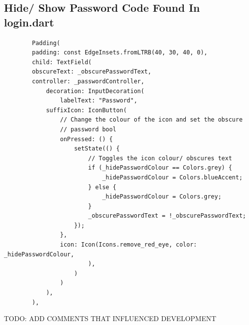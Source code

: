 \documentclass[12pt]{article}
\begin{document}
	\subsection{Hide/ Show Password Code Found In login.dart}
	\label{code:obscure-text}
	\begin{verbatim}
		Padding(
		padding: const EdgeInsets.fromLTRB(40, 30, 40, 0),
		child: TextField(
		obscureText: _obscurePasswordText,
		controller: _passwordController,
			decoration: InputDecoration(
				labelText: "Password",
			suffixIcon: IconButton(
				// Change the colour of the icon and set the obscure 
				// password bool
				onPressed: () {
					setState(() {
						// Toggles the icon colour/ obscures text
						if (_hidePasswordColour == Colors.grey) {
							_hidePasswordColour = Colors.blueAccent;
						} else {
							_hidePasswordColour = Colors.grey;
						}
						_obscurePasswordText = !_obscurePasswordText;
					});
				},
				icon: Icon(Icons.remove_red_eye, color: _hidePasswordColour,
						),
					)
				)
			),
		),
		\end{verbatim}
	

		TODO: ADD COMMENTS THAT INFLUENCED DEVELOPMENT
	
\end{document}
